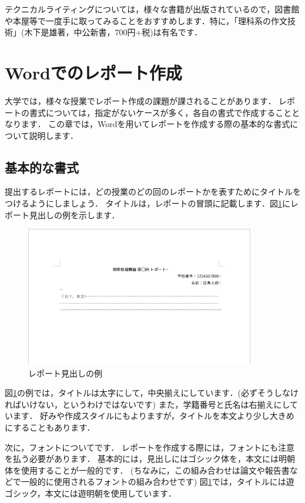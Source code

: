 \documentclass{jarticle}
\begin{document}
テクニカルライティングについては，様々な書籍が出版されているので，図書館や本屋等で一度手に取ってみることをおすすめします．特に，「理科系の作文技術」(木下是雄著，中公新書，700円+税)は有名です．

\section{Wordでのレポート作成}
大学では，様々な授業でレポート作成の課題が課されることがあります．
レポートの書式については，指定がないケースが多く，各自の書式で作成することとなります．
この章では，Wordを用いてレポートを作成する際の基本的な書式について説明します．

\subsection{基本的な書式}
提出するレポートには，どの授業のどの回のレポートかを表すためにタイトルをつけるようにしましょう．
タイトルは，レポートの冒頭に記載します．図\ref{fig:title}にレポート見出しの例を示します．

\begin{figure}[H]
  \centering
  \includegraphics[width=10cm]{fig/title.png}
  \caption{レポート見出しの例}
  \label{fig:title}
\end{figure}

図\ref{fig:title}の例では，タイトルは太字にして，中央揃えにしています．(必ずそうしなければいけない，というわけではないです)
また，学籍番号と氏名は右揃えにしています．
好みや作成スタイルにもよりますが，タイトルを本文より少し大きめにすることもあります．

次に，フォントについてです．
レポートを作成する際には，フォントにも注意を払う必要があります．
基本的には，見出しにはゴシック体を，本文には明朝体を使用することが一般的です．
(ちなみに，この組み合わせは論文や報告書などで一般的に使用されるフォントの組み合わせです)
図\ref{fig:title}では，タイトルには遊ゴシック，本文には遊明朝を使用しています．
\end{document}
